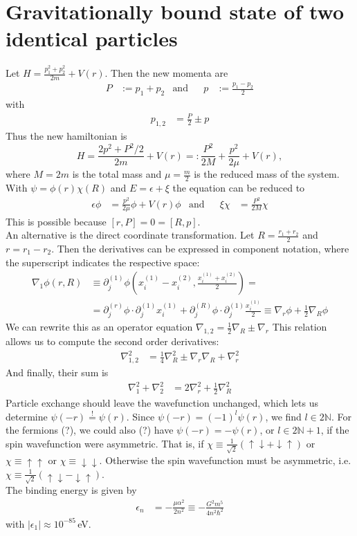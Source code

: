 \documentclass[english, parskip=full]{scrartcl}
\newcommand{\kla}{}
\newcommand{\klam}{}
\newcommand{\tecxt}{}
\begin{document}
\section{Gravitationally bound state of two identical particles}
Let $H=\frac{p_1^2+p_2^2}{2m}+V(r)$. 
Then the new momenta are
\begin{align*}
P&:=p_1+p_2&\tecxt\text{and}&&p&:=\frac{p_1-p_2}{2}
\end{align*}
with
\begin{align*}
p_{1,2}&=\frac{P}{2}\pm p
\end{align*}
Thus the new hamiltonian is 
$$H=\frac{2p^2+P^2/2}{2m}+V(r)=:\frac{P^2}{2M}+\frac{p^2}{2\mu}+V(r),$$
where $M=2m$ is the total mass and $\mu=\frac{m}{2}$ is the reduced mass of the system. 
With $\psi=\phi(r)\chi(R)$ and $E=\epsilon+\xi$ the equation can be reduced to
\begin{align*}
\epsilon\phi&=\frac{p^2}{2\mu}\phi+V(r)\phi&\tecxt\text{and}&&\xi\chi&=\frac{P^2}{2M}\chi
\end{align*}
This is possible because $\klam\left[ {r,P} \right]=0=\klam\left[ {R,p} \right]$.
\\
An alternative is the direct coordinate transformation.
Let $R=\frac{r_1+r_2}{2}$ and $r=r_1-r_2$. 
Then the derivatives can be expressed in component notation, where the superscript indicates the respective space:
\begin{align*}
\nabla_1\phi(r,R)&\equiv\partial_j^{(1)}\phi \kla\left( {x_i^{(1)}-x_i^{(2)},\frac{x_i^{(1)}+x_i^{(2)}}{2}} \right)=\\
&=\partial_j^{(r)}\phi\cdot \partial_j^{(1)}x_i^{(1)}+\partial_j^{(R)}\phi\cdot \partial_j^{(1)}\frac{x_i^{(1)}}{2}\equiv\nabla_r\phi+\frac{1}{2}\nabla_R\phi
\end{align*}
We can rewrite this as an operator equation $\nabla_{1,2}=\frac{1}{2}\nabla_R\pm\nabla_r$
This relation allows us to compute the second order derivatives:
\begin{align*}
\nabla_{1,2}^2&=\frac{1}{4}\nabla_R^2 \pm \nabla_r\nabla_R + \nabla_r^2
\end{align*}
And finally, their sum is 
\begin{align*}
\nabla_1^2+\nabla_2^2&=2\nabla_r^2+\frac{1}{2}\nabla_R^2
\end{align*}
Particle exchange should leave the wavefunction unchanged, which lets us determine $\psi(-r)\overset{!}{=}\psi(r)$. 
Since $\psi(-r)=(-1)^l\psi(r)$, we find $l\in 2\mathbb{N}$.
For the fermions (?), we could also (?) have $\psi(-r)=-\psi(r)$, or $l\in 2\mathbb{N}+1$, if the spin wavefunction were asymmetric.
That is, if $\chi\equiv\frac{1}{\sqrt{2}}\kla\left( {\uparrow\downarrow+\downarrow\uparrow} \right)$ or $\chi\equiv\uparrow\uparrow$ or $\chi\equiv\downarrow\downarrow$.
Otherwise the spin wavefunction must be asymmetric, i.e. $\chi\equiv\frac{1}{\sqrt{2}}\kla\left( {\uparrow\downarrow-\downarrow\uparrow} \right)$.
\\
The binding energy is given by 
\begin{align*}
\epsilon_n&=-\frac{\mu\alpha^2}{2n^2}\equiv -\frac{G^2m^5}{4n^2\hbar^2}
\end{align*}
with $|\epsilon_1|\approx 10^{-85}\,$eV.
\end{document}
